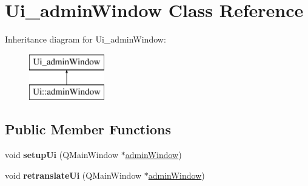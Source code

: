 \hypertarget{class_ui__admin_window}{}\section{Ui\+\_\+admin\+Window Class Reference}
\label{class_ui__admin_window}
Inheritance diagram for Ui\+\_\+admin\+Window\+:\begin{figure}[H]
\begin{center}
\leavevmode
\includegraphics[height=2.000000cm]{class_ui__admin_window}
\end{center}
\end{figure}
\subsection*{Public Member Functions}
\begin{DoxyCompactItemize}
\item 
\mbox{\label{class_ui__admin_window_a7057c6fc6718b89da0d1ef1e8feb5e62}} 
void {\bfseries setup\+Ui} (Q\+Main\+Window $\ast$\hyperlink{classadmin_window}{admin\+Window})
\item 
\mbox{\label{class_ui__admin_window_ac7535c816a61f0c9b55d8d8fbe774130}} 
void {\bfseries retranslate\+Ui} (Q\+Main\+Window $\ast$\hyperlink{classadmin_window}{admin\+Window})
\end{DoxyCompactItemize}

